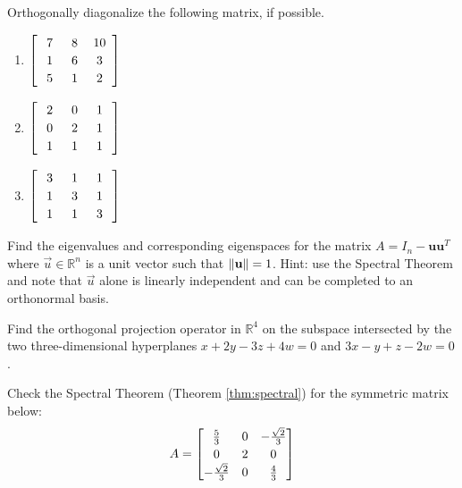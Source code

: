 \begin{Exercise}
Orthogonally diagonalize the following matrix, if possible.
\begin{enumerate}[label=(\alph*)]
\item $\left[\begin{array}{wc{10pt}wc{10pt}wc{10pt}}
7 & 8 & 10\\
1 & 6 & 3\\
5 & 1 & 2
\end{array}\right]$
\item $\left[\begin{array}{wc{10pt}wc{10pt}wc{10pt}}
2 & 0 & 1\\
0 & 2 & 1\\
1 & 1 & 1
\end{array}\right]$
\item $\left[\begin{array}{wc{10pt}wc{10pt}wc{10pt}}
3 & 1 & 1\\
1 & 3 & 1\\
1 & 1 & 3
\end{array}\right]$
\end{enumerate}
\end{Exercise}

\begin{Exercise}
Find the eigenvalues and corresponding eigenspaces for the matrix $A = I_n - \textbf{u}\textbf{u}^T$ where $\vec{u} \in \mathbb{R}^n$ is a unit vector such that $\norm{\textbf{u}} = 1$. Hint: use the Spectral Theorem and note that $\vec{u}$ alone is linearly independent and can be completed to an orthonormal basis.
\end{Exercise}

\begin{Exercise}
Find the orthogonal projection operator in $\mathbb{R}^4$ on the subspace intersected by the two three-dimensional hyperplanes $x + 2y - 3z + 4w = 0$ and $3x - y + z - 2w = 0$.
\end{Exercise}

\begin{Exercise}
Check the Spectral Theorem (Theorem \ref{thm:spectral}) for the symmetric matrix below:
\begin{align*}
A = 
\renewcommand\arraystretch{1.2}
\begin{bmatrix}
\frac{5}{3}&0&-\frac{\sqrt{2}}{3}\\ 
0&2&0\\ 
-\frac{\sqrt{2}}{3}&0&\frac{4}{3}
\end{bmatrix}
\end{align*}
\end{Exercise}

